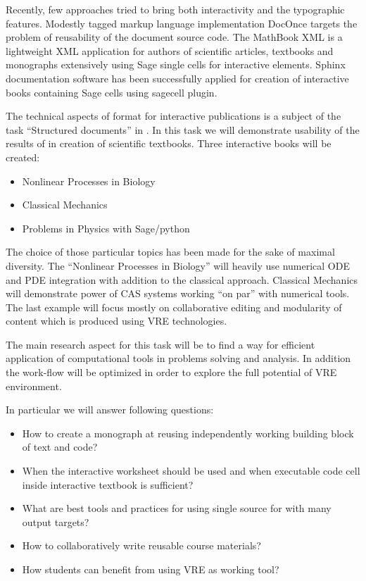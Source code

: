 \begin{workpackage}[id=dissem,wphases=18-48!.5,
  title=Dissemination,
  SARM=1,
  USORM=10,
  USHRM=8,
  USRM=24
]
\begin{tasklist}
\begin{task}[title=Demonstrator: interactive books,
id=ibook]
Recently, few approaches tried to bring both interactivity and the
typographic features. Modestly tagged markup language implementation
DocOnce targets the problem of reusability of the document source
code. The MathBook XML is a lightweight XML application for authors of
scientific articles, textbooks and monographs extensively using Sage
single cells for interactive elements. Sphinx documentation software
has been successfully applied for creation of interactive books
containing Sage cells using sagecell plugin. 

The technical aspects of format for interactive publications is a
subject of the task ``Structured documents'' in
. In this task we will demonstrate usability
of the results of  in creation of scientific
textbooks. Three interactive books will be created:

\begin{itemize}
\item Nonlinear Processes in Biology 
\item Classical Mechanics  
\item Problems  in Physics with Sage/python    
\end{itemize}

The choice of those particular topics has been made for the sake of maximal diversity. The ``Nonlinear Processes in Biology'' will heavily use numerical ODE and PDE integration with addition to the classical approach. Classical Mechanics will demonstrate power of CAS systems working ``on par'' with numerical tools. The last example will focus mostly on collaborative editing and modularity of content which is produced using VRE technologies. 

The main research aspect for this task will be to find a way for efficient application of computational tools in problems solving and analysis. In addition the work-flow will be optimized in order to explore the full potential of VRE environment. 

In particular we will answer following questions:

\begin{itemize}
\item How to create a monograph at reusing independently working   building block of text and code?
\item When the interactive worksheet should be used and when  executable code cell inside interactive textbook is sufficient?
\item What are best tools and practices for using single source for with many output targets? 
\item How to collaboratively write reusable course materials?
\item How students can benefit from  using VRE as working tool?
\end{itemize}



\end{task}
\end{tasklist}
\end{workpackage}

